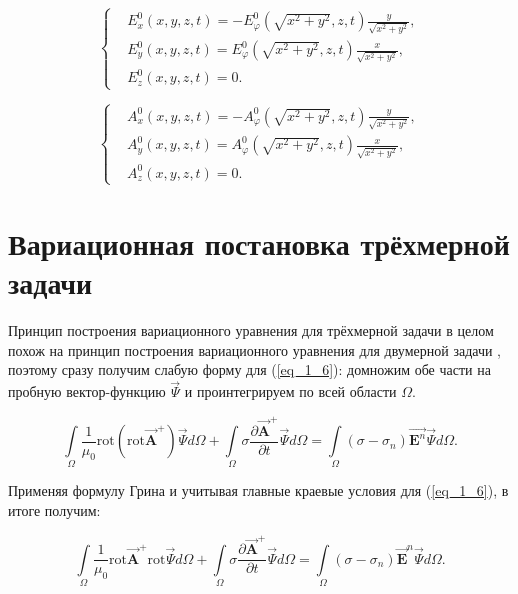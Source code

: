 \begin{equation} \label{eq_2_29}
	\begin{cases}
		&	E_x^0(x, y, z, t) = -E_{\varphi}^0(\sqrt{x^2 + y^2}, z, t)\frac{y}{\sqrt{x^2 + y^2}},\\
		& 	E_y^0(x, y, z, t) = E_{\varphi}^0(\sqrt{x^2 + y^2}, z, t)\frac{x}{\sqrt{x^2 + y^2}},\\
		& 	E_z^0(x, y, z, t) = 0.
	\end{cases}
\end{equation}

\begin{equation} \label{eq_2_30}
	\begin{cases}
		&	A_x^0(x, y, z, t) = -A_{\varphi}^0(\sqrt{x^2 + y^2}, z, t)\frac{y}{\sqrt{x^2 + y^2}},\\
		& 	A_y^0(x, y, z, t) = A_{\varphi}^0(\sqrt{x^2 + y^2}, z, t)\frac{x}{\sqrt{x^2 + y^2}},\\
		& 	A_z^0(x, y, z, t) = 0.
	\end{cases}
\end{equation}

\section{Вариационная постановка трёхмерной задачи}

Принцип построения вариационного уравнения для трёхмерной задачи в целом похож на принцип построения вариационного уравнения для двумерной задачи \cite{8}, поэтому сразу получим слабую форму для (\ref{eq_1_6}): домножим обе части на пробную вектор-функцию $\overrightarrow{\Psi}$ и проинтегрируем по всей области $\Omega$.

\begin{equation} \label{eq_2_35}
	\int \limits_{\Omega} \frac{1}{\mu_0}  \text{rot} \left( \text{rot} \overrightarrow{\textbf{A}}^+ \right) \overrightarrow{\Psi} d \Omega + \int \limits_{\Omega} \sigma \frac{\partial \overrightarrow{\textbf{A}}^+}{\partial t} \overrightarrow{\Psi} d \Omega = \int \limits_{\Omega}(\sigma - \sigma_n) \overrightarrow{\textbf{E}^n} \overrightarrow{\Psi} d \Omega.
\end{equation}

Применяя формулу Грина и учитывая главные краевые условия для (\ref{eq_1_6}), в итоге получим:

\begin{equation} \label{eq_2_36}
	\int \limits_{\Omega} \frac{1}{\mu_0} \text{rot} \overrightarrow{\textbf{A}}^+ \text{rot}  \overrightarrow{\Psi} d \Omega + \int \limits_{\Omega} \sigma \frac{\partial \overrightarrow{\textbf{A}}^+}{\partial t} \overrightarrow{\Psi} d \Omega = \int \limits_{\Omega}(\sigma - \sigma_n) \overrightarrow{\textbf{E}}^n \overrightarrow{\Psi} d \Omega.
\end{equation}

